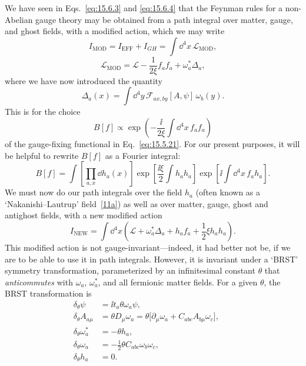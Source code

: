 We have seen in Eqs.~\eqref{eq:15.6.3} and \eqref{eq:15.6.4} that the Feynman rules for a non-Abelian gauge theory may be obtained from a path integral over matter, gauge, and ghost fields, with a modified action, which we may write
\begin{equation}
 I_{\mathrm{MOD}}=I_{\mathrm{EFF}}+I_{GH}=\int \dd^4x\,\mathcal L_{\mathrm{MOD}},
 \tag{15.7.1}\label{eq:15.7.1}
\end{equation}
\begin{equation}
 \mathcal L_{\mathrm{MOD}}=\mathcal L-\frac{1}{2\xi}f_a f_a+\omega_a^*\Delta_a,
 \tag{15.7.2}\label{eq:15.7.2}
\end{equation}
where we have now introduced the quantity
\begin{equation}
 \Delta_a(x)=\int \dd^4y\,\mathcal F_{a x,b y}[A,\psi]\,\omega_b(y).
 \tag{15.7.3}\label{eq:15.7.3}
\end{equation}
This is for the choice
\begin{equation}
 B[f]\propto\exp\left(-\frac{\ii}{2\xi}\int \dd^4x\,f_a f_a\right)
 \tag{15.7.4}\label{eq:15.7.4}
\end{equation}
of the gauge-fixing functional in Eq.~\eqref{eq:15.5.21}. For our present purposes, it will be helpful to rewrite $B[f]$ as a Fourier integral:
\begin{equation}
 B[f]=\int\left[\prod_{a,x}\dd h_a(x)\right]
 \exp\left[\frac{\ii\xi}{2}\int h_a h_a\right]
 \exp\left[\ii\int \dd^4x\,f_a h_a\right].
 \tag{15.7.5}\label{eq:15.7.5}
\end{equation}
We must now do our path integrals over the field $h_a$ (often known as a `Nakanishi--Lautrup' field~\hyperref[ch15-ref-11a]{[11a]}) as well as over matter, gauge, ghost and antighost fields, with a new modified action
\begin{equation}
 I_{\mathrm{NEW}}=\int \dd^4x\left(\mathcal L+\omega_a^*\Delta_a+h_a f_a+\frac{1}{2}\xi h_a h_a\right).
 \tag{15.7.6}\label{eq:15.7.6}
\end{equation}
This modified action is not gauge-invariant---indeed, it had better not be, if we are to be able to use it in path integrals. However, it is invariant under a `BRST' symmetry transformation, parameterized by an infinitesimal constant $\theta$ that \emph{anticommutes} with $\omega_a$, $\omega_a^*$, and all fermionic matter fields. For a given $\theta$, the BRST transformation is
\begin{align}
 \delta_\theta\psi&=\ii t_a\theta\omega_a\psi,
 &&\tag{15.7.7}\label{eq:15.7.7}\\
 \delta_\theta A_{a\mu}&=\theta D_\mu\omega_a
 =\theta\bigl[\partial_\mu\omega_a+C_{abc}A_{b\mu}\omega_c\bigr],
 &&\tag{15.7.8}\label{eq:15.7.8}\\
 \delta_\theta\omega_a^*&=-\theta h_a,
 &&\tag{15.7.9}\label{eq:15.7.9}\\
 \delta_\theta\omega_a&=-\frac{1}{2}\theta C_{abc}\omega_b\omega_c,
 &&\tag{15.7.10}\label{eq:15.7.10}\\
 \delta_\theta h_a&=0.
 &&\tag{15.7.11}\label{eq:15.7.11}
\end{align}
